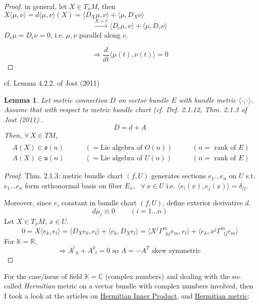 \documentclass[10pt]{amsart}
\newtheorem{lemma}{Lemma}
\begin{document}
\begin{multicols*}{2}
\begin{proof}
in general, let $X \in T_xM$, then $X\langle \mu, \nu \rangle = d\langle \mu, \nu \rangle(X) = \langle D_X \mu , \nu \rangle + \langle \mu, D_X \nu \rangle$
\[
\xrightarrow{ X = \dot{c}} \langle D_{\dot{c}} \mu, \nu \rangle + \langle \mu, D_{\dot{c}} \nu \rangle 
\]
$D_{\dot{c}}\mu = D_{\dot{c}}\nu = 0$, i.e. $\mu,\nu$ parallel along $c$.  

\[
\Longrightarrow \frac{d}{dt} \langle \mu(t), \nu(t) \rangle = 0 
\]
\end{proof}

cf. Lemma 4.2.2. of Jost (2011) \cite{JJost2011}
\begin{lemma}
  Let metric connection $D$ on vector bundle $E$ with bundle metric $\langle \cdot , \cdot \rangle$.   \\
Assume that with respect to metric bundle chart (cf. Def. 2.1.12, Thm. 2.1.3 of Jost (2011) \cite{JJost2011}.  
\[
D = d+A
\]
Then, $\forall \, X \in TM$, $\begin{aligned} & \quad \\
  & A(X) \in \mathfrak{o}(n) \qquad \, & (= \text{Lie algebra of $O(n)$}) \qquad & (n=\text{ rank of $E$}) \\ 
  & A(X) \in \mathfrak{u}(n) \qquad \, & (= \text{Lie algebra of $U(n)$}) \qquad & (n=\text{ rank of $E$}) 
\end{aligned}$
\end{lemma}

\begin{proof}
  Thm. 2.1.3: metric bundle chart $(f,U)$ generates sections $e_1 \dots e_n $ on $U$ s.t. $e_1 \dots e_n$ form orthonormal basis on fiber $E_x$, \, $\forall \, x \in U$ i.e. $\langle e_i(x), e_j(x) \rangle = \delta_{ij}$.  

Moreover, since $e_i$ constant in bundle chart $(f,U)$, define exterior derivative $d$.  
\[
d\mu_i \equiv 0 \qquad \, (i=1\dots n)
\]
Let $X\in T_xM$, $x\in U$.  
\[
0 = X\langle e_k,e_l\rangle = \langle D_X e_k,e_l \rangle + \langle e_k , D_Xe_l\rangle = \langle X^j \Gamma^m_{ \; \; kj } e_m, e_l \rangle + \langle e_k , x^j \Gamma^m_{ \; \; lj } e_m \rangle
\]
For $\mathbb{K} = \mathbb{R}$, 
\[
\Longrightarrow A^l_{ \; \; k} + A^k_{ \; \; l} = 0 \text{ so } A = -A^T \text{ skew symmetric } 
\]

\end{proof}

For the case/issue of field $\mathbb{K} = \mathbb{C}$ (complex numbers) and dealing with the so-called \emph{Hermitian} metric on a vector bundle with complex numbers involved, then I took a look at the articles on \href{http://mathworld.wolfram.com/HermitianInnerProduct.html}{Hermitian Inner Product}, and \href{https://en.wikipedia.org/wiki/Hermitian_manifold}{Hermitian metric}:



\end{multicols*}
\end{document}
